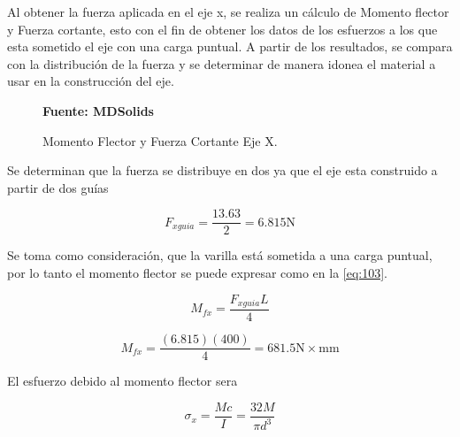 Al obtener la fuerza aplicada en el eje x, se realiza un cálculo de Momento flector y Fuerza cortante, esto con el fin de obtener los datos de los esfuerzos a los que esta sometido el eje con una carga puntual. A partir de los resultados, se compara con la distribución de la fuerza y se determinar de manera idonea el material a usar en la construcción del eje.\\


\begin{figure}[H]
    \centering
    \caption{Momento Flector y Fuerza Cortante Eje X.}
    \label{fig:CAL1}
     \textbf{Fuente: MDSolids}
\end{figure}

Se determinan que la fuerza se distribuye en dos ya que el eje esta construido a partir de dos guías 

\[F_{xguia}=\frac{13.63}{2}=6.815\text{N}\]

Se toma como consideración, que la varilla está sometida a una carga puntual, por lo tanto el momento flector se puede expresar como en la \autoref{eq:103}.

\begin{equation}
M_{fx}=\frac{F_{xguia}L}{4}
\label{eq:103}
\end{equation}

\[M_{fx}=\frac{(6.815)(400)}{4}=681.5\text{N}\times \text{mm}\]

El esfuerzo debido al momento flector sera

\[\sigma_x=\frac{Mc}{I}=\frac{32M}{\pi d^3}\]

